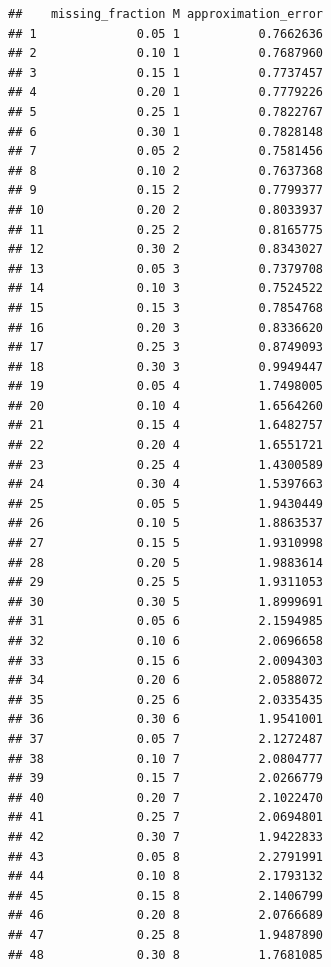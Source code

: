 \documentclass[
  11pt,
]{article}
\begin{document}
\begin{verbatim}
##    missing_fraction M approximation_error
## 1              0.05 1           0.7662636
## 2              0.10 1           0.7687960
## 3              0.15 1           0.7737457
## 4              0.20 1           0.7779226
## 5              0.25 1           0.7822767
## 6              0.30 1           0.7828148
## 7              0.05 2           0.7581456
## 8              0.10 2           0.7637368
## 9              0.15 2           0.7799377
## 10             0.20 2           0.8033937
## 11             0.25 2           0.8165775
## 12             0.30 2           0.8343027
## 13             0.05 3           0.7379708
## 14             0.10 3           0.7524522
## 15             0.15 3           0.7854768
## 16             0.20 3           0.8336620
## 17             0.25 3           0.8749093
## 18             0.30 3           0.9949447
## 19             0.05 4           1.7498005
## 20             0.10 4           1.6564260
## 21             0.15 4           1.6482757
## 22             0.20 4           1.6551721
## 23             0.25 4           1.4300589
## 24             0.30 4           1.5397663
## 25             0.05 5           1.9430449
## 26             0.10 5           1.8863537
## 27             0.15 5           1.9310998
## 28             0.20 5           1.9883614
## 29             0.25 5           1.9311053
## 30             0.30 5           1.8999691
## 31             0.05 6           2.1594985
## 32             0.10 6           2.0696658
## 33             0.15 6           2.0094303
## 34             0.20 6           2.0588072
## 35             0.25 6           2.0335435
## 36             0.30 6           1.9541001
## 37             0.05 7           2.1272487
## 38             0.10 7           2.0804777
## 39             0.15 7           2.0266779
## 40             0.20 7           2.1022470
## 41             0.25 7           2.0694801
## 42             0.30 7           1.9422833
## 43             0.05 8           2.2791991
## 44             0.10 8           2.1793132
## 45             0.15 8           2.1406799
## 46             0.20 8           2.0766689
## 47             0.25 8           1.9487890
## 48             0.30 8           1.7681085
\end{verbatim}
\end{document}
